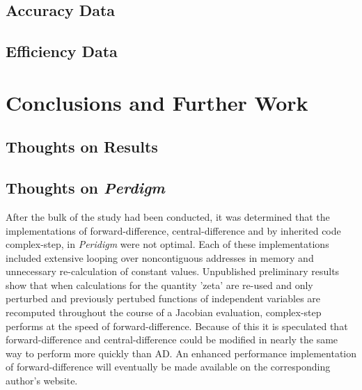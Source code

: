 \documentclass[preprint,12pt]{elsarticle}
\begin{document}
\subsection{Accuracy Data}
\subsection{Efficiency Data}

\section{Conclusions and Further Work}

\subsection{Thoughts on Results}


\subsection{Thoughts on \emph{Perdigm}}

After the bulk of the study had been conducted, it was determined that the implementations of
forward-difference, central-difference and by inherited code complex-step, in \emph{Peridigm} were
not optimal. Each of these implementations included extensive looping over noncontiguous addresses
in memory and unnecessary re-calculation of constant values. Unpublished preliminary results show
that when calculations for the quantity 'zeta' are re-used and only perturbed and previously
pertubed functions of independent variables are recomputed throughout the course of a Jacobian
evaluation, complex-step performs at the speed of forward-difference. Because of this it is
speculated that forward-difference and central-difference could be modified in nearly the same way to
perform more quickly than AD. An enhanced performance implementation of forward-difference will
eventually be made available on the corresponding author's website.
\end{document}
